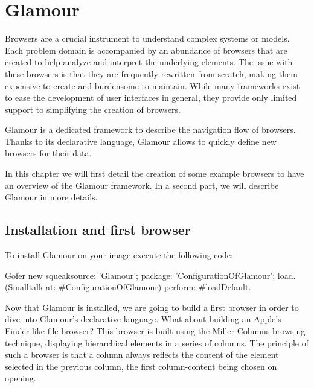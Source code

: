 \documentclass[a4paper,10pt,twoside]{book}
\begin{document}
\fi
\sloppy
\chapter{Glamour}
\label{glamour}

Browsers are a crucial instrument to understand complex systems or
models. Each problem domain is accompanied by an abundance of browsers
that are created to help analyze and interpret the underlying
elements. The issue with these browsers is that they are frequently
rewritten from scratch, making them expensive to create and burdensome
to maintain. While many frameworks exist to ease the development of
user interfaces in general, they provide only limited support to
simplifying the creation of browsers.

Glamour is a dedicated framework to describe the navigation flow
of browsers. Thanks to its declarative language, Glamour allows to
quickly define new browsers for their data.

In this chapter we will first detail the creation of some example
browsers to have an overview of the Glamour framework. In a second
part, we will describe Glamour in more details.

\section{Installation and first browser}
\label{sec:inst-first-brows}

To install Glamour on your \pharo{} image execute the following code:

\begin{code}{}
Gofer new
  squeaksource: 'Glamour'; 
  package: 'ConfigurationOfGlamour';
  load.
(Smalltalk at: #ConfigurationOfGlamour)
  perform: #loadDefault.
\end{code}

Now that Glamour is installed, we are going to build a first browser
in order to dive into Glamour's declarative language. What about
building an Apple's Finder-like file browser? This browser is built
using the Miller Columns browsing technique, displaying hierarchical
elements in a series of columns. The principle of such a browser is
that a column always reflects the content of the element selected in
the previous column, the first column-content being chosen on opening.
\end{document}
